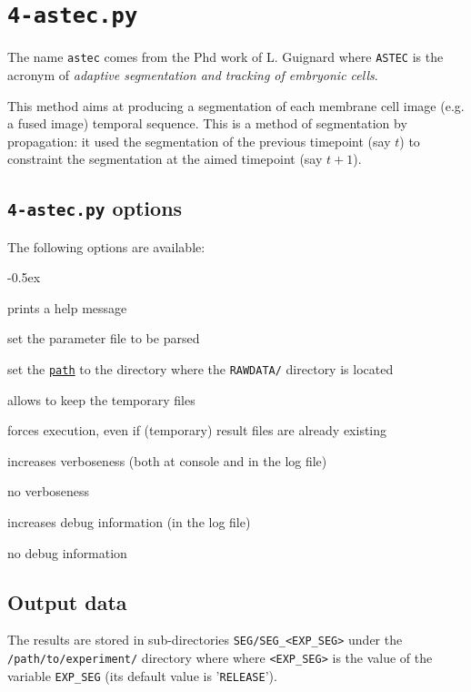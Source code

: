 \section{\texttt{4-astec.py}}
\label{sec:cli:astec}

The name \texttt{astec} comes from the Phd work of L. Guignard \cite{guignard:tel-01278725} where \texttt{ASTEC} is the acronym of \textit{adaptive segmentation and tracking of embryonic cells}.

This method aims at producing a segmentation of each membrane cell image  (e.g. a fused image) temporal sequence. This is a method of segmentation by propagation: it used the segmentation of the previous timepoint (say $t$) to constraint the segmentation at the aimed timepoint (say $t+1$).


\subsection{\texttt{4-astec.py} options}

The following options are available:
\begin{description}
  \itemsep -0.5ex
\item[\texttt{-h}] prints a help message
\item[\texttt{-p \underline{file}}] set the parameter file to be parsed
\item[\texttt{-e \underline{path}}] set the
  \texttt{\underline{path}} to the directory where the
  \texttt{RAWDATA/} directory is located
\item[\texttt{-k}] allows to keep the temporary files
\item[\texttt{-f}] forces execution, even if (temporary) result files
  are already existing
\item[\texttt{-v}] increases verboseness (both at console and in the
  log file)
\item[\texttt{-nv}] no verboseness
\item[\texttt{-d}]  increases debug information (in the
  log file)
\item[\texttt{-nd}] no debug information
\end{description}



\subsection{Output data}
\label{sec:cli:astec:output:data}

The results are stored in sub-directories
\texttt{SEG/SEG\_<EXP\_SEG>} under the
\texttt{/path/to/experiment/} directory where where \texttt{<EXP\_SEG>} is the value of the variable \texttt{EXP\_SEG} (its
default value is '\texttt{RELEASE}'). 

